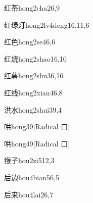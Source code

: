 \begin{entry}{红茶}{hong2cha2}{6,9}
\end{entry}

\begin{entry}{红绿灯}{hong2lv4deng1}{6,11,6}
\end{entry}

\begin{entry}{红色}{hong2se4}{6,6}
\end{entry}

\begin{entry}{红烧}{hong2shao1}{6,10}
\end{entry}

\begin{entry}{红薯}{hong2shu3}{6,16}
\end{entry}

\begin{entry}{红线}{hong2xian4}{6,8}
\end{entry}

\begin{entry}{洪水}{hong2shui3}{9,4}
\end{entry}

\begin{entry}{哄}{hong3}{9}[Radical 口]
\end{entry}

\begin{entry}{哄}{hong4}{9}[Radical 口]
\end{entry}

\begin{entry}{猴子}{hou2zi5}{12,3}
\end{entry}

\begin{entry}{后边}{hou4bian5}{6,5}
\end{entry}

\begin{entry}{后来}{hou4lai2}{6,7}
\end{entry}

